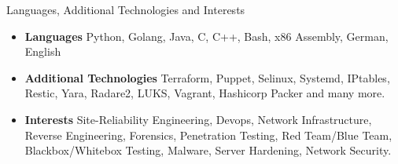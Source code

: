 \documentclass[]{mcdowellcv}
\begin{document}
\begin{cvsection}{Languages, Additional Technologies and Interests}
\begin{cvsubsection}{}{}{}
\begin{itemize}
\item \textbf{Languages} Python, Golang, Java, C, C++, Bash, x86 Assembly, German, English
\item \textbf{Additional Technologies} Terraform, Puppet, Selinux, Systemd, IPtables, Restic, Yara, Radare2, LUKS, Vagrant, Hashicorp Packer and many more.
\item \textbf{Interests} Site-Reliability Engineering, Devops, Network Infrastructure, Reverse Engineering, Forensics, Penetration Testing, Red Team/Blue Team, Blackbox/Whitebox Testing, Malware, Server Hardening, Network Security.
\end{itemize}
\end{cvsubsection}
\end{cvsection}
\end{document}
